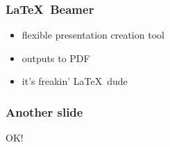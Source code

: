 \begin{frame}
\frametitle{\LaTeX\ Beamer}
\begin{itemize}
\item flexible presentation creation tool
\item outputs to PDF
\item it's freakin' \LaTeX\ dude
\end{itemize}
\end{frame}

\begin{frame}
\frametitle{Another slide}
OK!
\end{frame}
